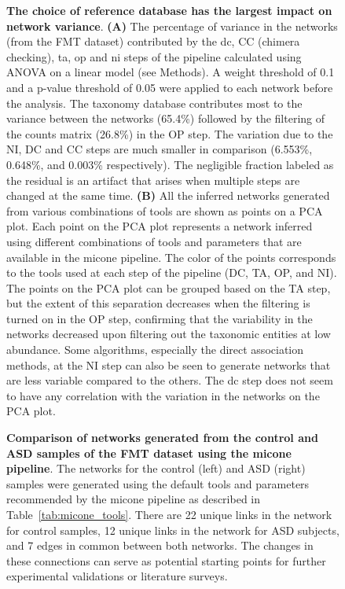 \documentclass[letterpaper,12pt]{article}
\begin{document}
  \begin{figure}[H]
    \centering
      \caption{
      \textbf{The choice of reference database has the largest impact on network variance}.
      \textbf{(A)} The percentage of variance in the networks (from the  FMT dataset) contributed by the \acf{dc}, CC (chimera checking), \acf{ta}, \acf{op} and \acf{ni} steps of the pipeline calculated using ANOVA on a linear model (see Methods).
      A weight threshold of 0.1 and a p-value threshold of 0.05 were applied to each network before the analysis.
      The taxonomy database contributes most to the variance between the networks (65.4\%) followed by the filtering of the counts matrix (26.8\%) in the OP step.
    The variation due to the NI, DC and CC steps are much smaller in comparison (6.553\%, 0.648\%, and 0.003\% respectively).
      The negligible fraction labeled as the residual is an artifact that arises when multiple steps are changed at the same time.
      \textbf{(B)} All the inferred networks generated from various combinations of tools are shown as points on a PCA plot.
      Each point on the PCA plot represents a network inferred using different combinations of tools and parameters that are available in the \ac{micone} pipeline.
      The color of the points corresponds to the tools used at each step of the pipeline (DC, TA, OP, and NI).
      The points on the PCA plot can be grouped based on the TA step, but the extent of this separation decreases when the filtering is turned on in the OP step, confirming that the variability in the networks decreased upon filtering out the taxonomic entities at low abundance.
      Some algorithms, especially the direct association methods, at the NI step can also be seen to generate networks that are less variable compared to the others.
      The \ac{dc} step does not seem to have any correlation with the variation in the networks on the PCA plot.
    }
    \label{fig:figure6}
  \end{figure}


  \begin{figure}[H]
    \centering
    \caption{
      \textbf{Comparison of networks generated from the control and ASD samples of the FMT dataset using the \ac{micone} pipeline}.
      The networks for the control (left) and ASD (right) samples were generated using the default tools and parameters recommended by the \ac{micone} pipeline as described in Table~\ref{tab:micone_tools}.
      There are 22 unique links in the network for control samples, 12 unique links in the network for ASD subjects, and 7 edges in common between both networks.
      The changes in these connections can serve as potential starting points for further experimental validations or literature surveys.
    }
    \label{fig:figure7}
  \end{figure}
\end{document}
